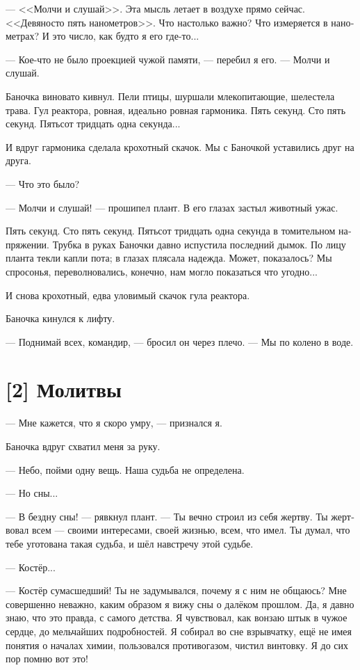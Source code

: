 \documentclass[a4paper,12pt,fleqn]{book}\usepackage{polyglossia}\setdefaultlanguage[babelshorthands=true]{russian}\setotherlanguage{english}\defaultfontfeatures{Ligatures=TeX,Mapping=tex-text}\usepackage{xcolor}\newcommand{\ml}[3]{#2}
\begin{document}
{--- <<Молчи и слушай>>.
Эта мысль летает в воздухе прямо сейчас.
<<Девяносто пять нанометров>>.
Что настолько важно?
Что измеряется в нанометрах?
И это число, как будто я его где-то...

--- Кое-что не было проекцией чужой памяти, --- перебил я его.
--- Молчи и слушай.

Баночка виновато кивнул.
Пели птицы, шуршали млекопитающие, шелестела трава.
Гул реактора, ровная, идеально ровная гармоника.
Пять секунд.
Сто пять секунд.
Пятьсот тридцать одна секунда...

И вдруг гармоника сделала крохотный скачок.
Мы с Баночкой уставились друг на друга.

--- Что это было?

--- Молчи и слушай! --- прошипел плант.
В его глазах застыл животный ужас.

Пять секунд.
Сто пять секунд.
Пятьсот тридцать одна секунда в томительном напряжении.
Трубка в руках Баночки давно испустила последний дымок.
По лицу планта текли капли пота;
в глазах плясала надежда.
Может, показалось?
Мы спросонья, переволновались, конечно, нам могло показаться что угодно...

И снова крохотный, едва уловимый скачок гула реактора.

Баночка кинулся к лифту.

--- Поднимай всех, командир, --- бросил он через плечо.
--- Мы по колено в воде.

\section{[2] Молитвы}

--- Мне кажется, что я скоро умру, --- признался я.

Баночка вдруг схватил меня за руку.

--- Небо, пойми одну вещь.
Наша судьба не определена.

--- Но сны...

--- В бездну сны! --- рявкнул плант.
--- Ты вечно строил из себя жертву.
Ты жертвовал всем --- своими интересами, своей жизнью, всем, что имел.
Ты думал, что тебе уготована такая судьба, и шёл навстречу этой судьбе.

--- Костёр...

--- Костёр сумасшедший!
Ты не задумывался, почему я с ним не общаюсь?
Мне совершенно неважно, каким образом я вижу сны о далёком прошлом.
Да, я давно знаю, что это правда, с самого детства.
Я чувствовал, как вонзаю штык в чужое сердце, до мельчайших подробностей.
Я собирал во сне взрывчатку, ещё не имея понятия о началах химии, пользовался противогазом, чистил винтовку.
Я до сих пор помню вот это!

}
\end{document}
